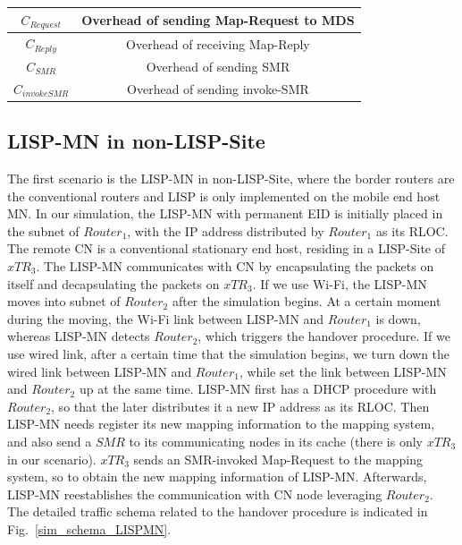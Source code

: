 {\begin{table}[!tb]
{\begin{tabular}{@{}|c|c|@{}}
			$C_{Request}$ &  Overhead of sending Map-Request to MDS      	\\  \hline   
			$C_{Reply}$ &  Overhead of receiving Map-Reply      	\\  \hline      
			$C_{SMR}$ &  Overhead of sending SMR       	\\  \hline 
			$C_{invokeSMR}$ &  Overhead of sending invoke-SMR \\  \hline  \hline    
		\end{tabular}
	}
\end{table}



\subsection{LISP-MN in non-LISP-Site}
\label{sec:ns3_analysis_lispmn}
The first scenario is the LISP-MN in non-LISP-Site, where the border routers are the conventional routers and LISP is only implemented on the mobile end host MN. In our simulation, the LISP-MN with permanent EID is initially placed in the subnet of $Router_1$, with the IP address distributed by $Router_1$ as its RLOC. The remote CN is a conventional stationary end host, residing in a LISP-Site of $xTR_3$. The LISP-MN communicates with CN by encapsulating the packets on itself and decapsulating the packets on $xTR_3$. If we use Wi-Fi, the LISP-MN moves into subnet of $Router_2$ after the simulation begins. At a certain moment during the moving, the Wi-Fi link between LISP-MN and $Router_1$ is down, whereas LISP-MN detects $Router_2$, which triggers the handover procedure. If we use wired link, after a certain time that the simulation begins, we turn down the wired link between LISP-MN and $Router_1$, while set the link between LISP-MN and $Router_2$ up at the same time. LISP-MN first has a DHCP procedure with $Router_2$, so that the later distributes it a new IP address as its RLOC. Then LISP-MN needs register its new mapping information to the mapping system, and also send a $SMR$ to its communicating nodes in its cache (there is only $xTR_3$ in our scenario). $xTR_3$ sends an SMR-invoked Map-Request to the mapping system, so to obtain the new mapping information of LISP-MN. Afterwards, LISP-MN reestablishes the communication with CN node leveraging $Router_2$. The detailed traffic schema related to the handover procedure is indicated in Fig.~\ref{sim_schema_LISPMN}.  %
}
